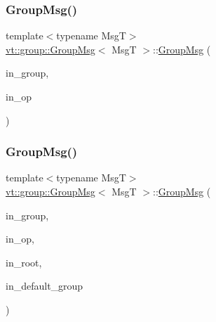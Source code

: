 \mbox{\label{structvt_1_1group_1_1_group_msg_af022390a490fffce73208c94efb4545b}} 
\subsubsection{\texorpdfstring{Group\+Msg()}{GroupMsg()}\hspace{0.1cm}{\footnotesize\ttfamily [2/3]}}
{\footnotesize\ttfamily template$<$typename MsgT$>$ \\
\hyperlink{structvt_1_1group_1_1_group_msg}{vt\+::group\+::\+Group\+Msg}$<$ MsgT $>$\+::\hyperlink{structvt_1_1group_1_1_group_msg}{Group\+Msg} (\begin{DoxyParamCaption}\item[{\hyperlink{namespacevt_a27b5e4411c9b6140c49100e050e2f743}{Group\+Type} const \&}]{in\+\_\+group,  }\item[{\hyperlink{namespacevt_1_1group_a73f2624ddeb535b39a08b6524f26b244}{Remote\+Operation\+I\+D\+Type} const \&}]{in\+\_\+op }\end{DoxyParamCaption})\hspace{0.3cm}{\ttfamily [inline]}}

\mbox{\label{structvt_1_1group_1_1_group_msg_a9ce944b6890d16ade1cb58d3f326c3b2}} 
\subsubsection{\texorpdfstring{Group\+Msg()}{GroupMsg()}\hspace{0.1cm}{\footnotesize\ttfamily [3/3]}}
{\footnotesize\ttfamily template$<$typename MsgT$>$ \\
\hyperlink{structvt_1_1group_1_1_group_msg}{vt\+::group\+::\+Group\+Msg}$<$ MsgT $>$\+::\hyperlink{structvt_1_1group_1_1_group_msg}{Group\+Msg} (\begin{DoxyParamCaption}\item[{\hyperlink{namespacevt_a27b5e4411c9b6140c49100e050e2f743}{Group\+Type} const \&}]{in\+\_\+group,  }\item[{\hyperlink{namespacevt_1_1group_a73f2624ddeb535b39a08b6524f26b244}{Remote\+Operation\+I\+D\+Type} const \&}]{in\+\_\+op,  }\item[{\hyperlink{namespacevt_a866da9d0efc19c0a1ce79e9e492f47e2}{Node\+Type} const \&}]{in\+\_\+root,  }\item[{bool const \&}]{in\+\_\+default\+\_\+group }\end{DoxyParamCaption})\hspace{0.3cm}{\ttfamily [inline]}}



